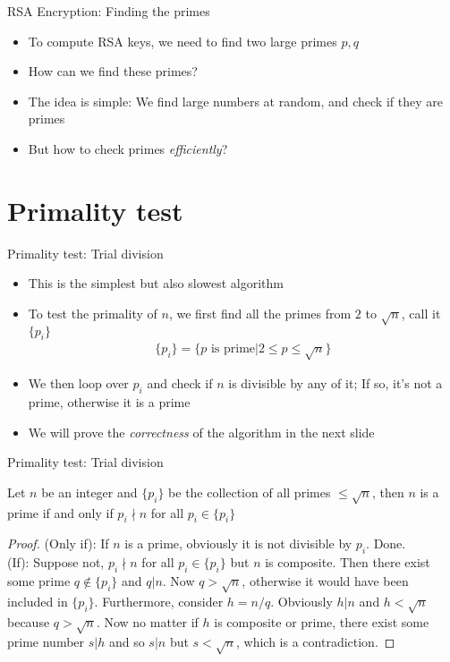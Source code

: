 \documentclass[10pt,xcolor={table,dvipsnames},t]{beamer}
\begin{document}
\begin{frame}{RSA Encryption: Finding the primes}
  \begin{itemize}
    \item To compute RSA keys, we need to find two large primes $p,q$
    \item How can we find these primes?
    \item The idea is simple: We find large numbers at random, and check if they are primes
    \item But how to check primes \textit{efficiently}?
  \end{itemize}
\end{frame}

\section{Primality test}
\begin{frame}{Primality test: Trial division}
  \begin{itemize}
    \item This is the simplest but also slowest algorithm
    \item To test the primality of $n$, we first find all the primes from $2$ to $\sqrt{n}$, call it $\{p_i\}$
    \begin{align*}
      \{p_i\} = \{p \text{ is prime} | 2 \leq p \leq \sqrt{n}\}
    \end{align*}
    \item We then loop over $p_i$ and check if $n$ is divisible by any of it; If so, it's not a prime, otherwise it is a prime
    \item We will prove the \textit{correctness} of the algorithm in the next slide
  \end{itemize}
\end{frame}

\begin{frame}{Primality test: Trial division}
  \begin{theorem}
    Let $n$ be an integer and $\{p_i\}$ be the collection of all primes $\leq \sqrt{n}$, then $n$ is a prime if and only if $p_i \nmid n$ for all $p_i \in \{p_i\}$ 
    \begin{proof}
      (Only if): If $n$ is a prime, obviously it is not divisible by $p_i$. Done.\\
      (If): Suppose not, $p_i \nmid n$ for all $p_i \in \{p_i\}$ but $n$ is composite. Then there exist some prime $q \notin \{p_i\}$ and $q|n$. Now $q>\sqrt{n}$, otherwise it would have been included in $\{p_i\}$. Furthermore, consider $h=n/q$. Obviously $h|n$ and $h<\sqrt{n}$ because $q>\sqrt{n}$. Now no matter if $h$ is composite or prime, there exist some prime number $s|h$ and so $s|n$ but $s<\sqrt{n}$, which is a contradiction.
    \end{proof}
  \end{theorem}
\end{frame}
\end{document}
